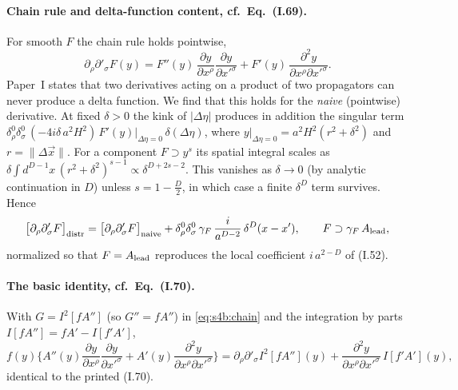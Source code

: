 \documentclass[aps,prd,onecolumn,10pt,nofootinbib,floatfix]{revtex4-2}
\newcommand{\PI}{Paper~I}
\newcommand{\eqI}[1]{(I.#1)}
\begin{document}
\paragraph*{Chain rule and delta-function content, cf.\ Eq.~(I.69).}
For smooth $F$ the chain rule holds pointwise,
\begin{equation}
\partial_\rho\partial'_\sigma F(y)=F''(y)\,\frac{\partial y}{\partial x^\rho}\frac{\partial y}{\partial x'^\sigma}
+F'(y)\,\frac{\partial^2y}{\partial x^\rho\partial x'^\sigma}.
\label{eq:s4b:chain}
\end{equation}
\PI{} states that two derivatives acting on a product of two propagators can never produce a delta function. We
find that this holds for the \emph{naive} (pointwise) derivative. At fixed $\delta>0$ the kink of $|\Delta\eta|$
produces in addition the singular term
$\delta^0_\rho\delta^0_\sigma\,(-4i\delta\,a^2H^2)\,F'(y)|_{\Delta\eta=0}\,\delta(\Delta\eta)$, where
$y|_{\Delta\eta=0}=a^2H^2(r^2+\delta^2)$ and $r=\|\Delta\vec x\|$. For a component $F\supset y^s$ its spatial integral
scales as $\delta\int d^{D-1}x\,(r^2+\delta^2)^{s-1}\propto\delta^{D+2s-2}$. This vanishes as $\delta\to0$ (by analytic
continuation in $D$) unless $s=1-\frac D2$, in which case a finite $\delta^D$ term survives. Hence
\begin{equation}
\big[\partial_\rho\partial'_\sigma F\big]_{\rm distr}=\big[\partial_\rho\partial'_\sigma F\big]_{\rm naive}
+\delta^0_\rho\delta^0_\sigma\,\gamma_F\,\frac{i}{a^{D-2}}\,\delta^D(x-x'),
\qquad F\supset\gamma_F\,A_{\rm lead} ,
\label{eq:s4b:distr}
\end{equation}
normalized so that $F=A_{\rm lead}$ reproduces the local coefficient $i\,a^{2-D}$ of \eqI{52}.

\paragraph*{The basic identity, cf.\ Eq.~(I.70).}
With $G=I^2[fA'']$ (so $G''=fA''$) in \eqref{eq:s4b:chain} and the integration by parts
$I[fA'']=fA'-I[f'A']$,
\begin{equation}
f(y)\Big\{A''(y)\frac{\partial y}{\partial x^\rho}\frac{\partial y}{\partial x'^\sigma}
+A'(y)\frac{\partial^2y}{\partial x^\rho\partial x'^\sigma}\Big\}
=\partial_\rho\partial'_\sigma I^2[fA''](y)+\frac{\partial^2y}{\partial x^\rho\partial x'^\sigma}\,I[f'A'](y),
\label{eq:s4b:I70}
\end{equation}
identical to the printed \eqI{70}.
\end{document}
